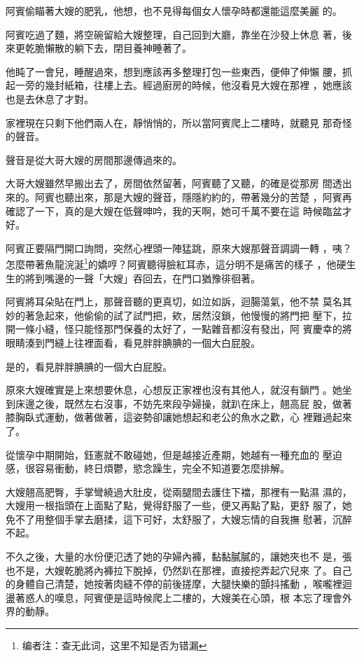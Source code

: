 阿賓偷瞄著大嫂的肥乳，他想，也不見得每個女人懷孕時都還能這麼美麗
的。

阿賓吃過了麵，將空碗留給大嫂整理，自己回到大廳，靠坐在沙發上休息
著，後來更乾脆懶散的躺下去，閉目養神睡著了。

他盹了一會兒，睡醒過來，想到應該再多整理打包一些東西，便伸了伸懶
腰，抓起一旁的幾封紙箱，往樓上去。經過廚房的時候，他沒看見大嫂在那裡
，她應該也是去休息了才對。

家裡現在只剩下他們兩人在，靜悄悄的，所以當阿賓爬上二樓時，就聽見
那奇怪的聲音。

聲音是從大哥大嫂的房間那邊傳過來的。

大哥大嫂雖然早搬出去了，房間依然留著，阿賓聽了又聽，的確是從那房
間透出來的。阿賓也聽出來，那是大嫂的聲音，隱隱約約的，帶著幾分的苦楚
，阿賓再確認了一下，真的是大嫂在低聲呻吟，我的天啊，她可千萬不要在這
時候臨盆才好。

阿賓正要隔門開口詢問，突然心裡頭一陣猛跳，原來大嫂那聲音調調一轉
，咦？怎麼帶著魚龍浣涎\footnote{编者注：查无此词，这里不知是否为错漏}的嬌哼？阿賓聽得臉紅耳赤，這分明不是痛苦的樣子
，他硬生生的將到嘴邊的一聲「大嫂」吞回去，在門口猶豫徘徊著。

阿賓將耳朵貼在門上，那聲音聽的更真切，如泣如訴，迴腸蕩氣，他不禁
莫名其妙的著急起來，他偷偷的試了試門把，欸，居然沒鎖，他慢慢的將門把
壓下，拉開一條小縫，怪只能怪那門保養的太好了，一點雜音都沒有發出，阿
賓慶幸的將眼睛湊到門縫上往裡面看，看見胖胖腆腆的一個大白屁股。

是的，看見胖胖腆腆的一個大白屁股。

原來大嫂確實是上來想要休息，心想反正家裡也沒有其他人，就沒有鎖門
。她坐到床邊之後，既然左右沒事，不妨先來段孕婦操，就趴在床上，翹高屁
股，做著膝胸臥式運動，做著做著，這姿勢卻讓她想起和老公的魚水之歡，心
裡難過起來了。

從懷孕中期開始，鈺憲就不敢碰她，但是越接近產期，她越有一種充血的
壓迫感，很容易衝動，終日煩鬱，慾念躁生，完全不知道要怎麼排解。

大嫂翹高肥臀，手掌彎繞過大肚皮，從兩腿間去護住下襠，那裡有一點濕
濕的，大嫂用一根指頭在上面點了點，覺得舒服了一些，便又再點了點，更舒
服了，她免不了用整個手掌去磨揉，這下可好，太舒服了，大嫂忘情的自我撫
慰著，沉醉不起。

不久之後，大量的水份便氾透了她的孕婦內褲，黏黏膩膩的，讓她夾也不
是，張也不是，大嫂乾脆將內褲拉下脫掉，仍然趴在那裡，直接挖弄起穴兒來
了。自己的身體自己清楚，她按著肉縫不停的前後搓摩，大腿快樂的顫抖搖動
，喉嚨裡迴盪著惑人的嘆息，阿賓便是這時候爬上二樓的，大嫂美在心頭，根
本忘了理會外界的動靜。


